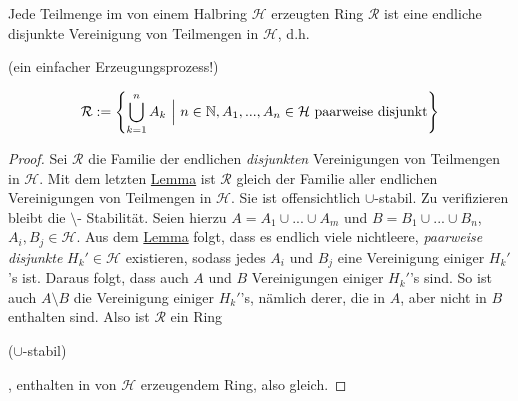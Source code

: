 \begin{proposition}
Jede Teilmenge im von einem Halbring $\mathcal{H}$ erzeugten Ring $\mathcal{R}$ ist eine endliche disjunkte Vereinigung von Teilmengen in $\mathcal{H}$, d.h. \begin{scriptsize}(ein einfacher Erzeugungsprozess!)\end{scriptsize}
\begin{equation}
\mathcal{R} := \left\{ \bigcup_{k=1}^n A_k \  \Big\rvert \ n\in \mathbb{N}, A_1,...,A_n \in \mathcal{H} \text{ paarweise disjunkt} \right\}
\label{eqI14}
\end{equation}
\begin{proof}
Sei $\mathcal{R}$ die Familie der endlichen \emph{disjunkten} Vereinigungen von Teilmengen in $\mathcal{H}$. Mit dem letzten \hyperref[lemmaA]{Lemma} ist $\mathcal{R}$ gleich der Familie aller endlichen Vereinigungen von Teilmengen in $\mathcal{H}$. Sie ist offensichtlich $\cup$-stabil. Zu verifizieren bleibt die $\setminus$- Stabilität. Seien hierzu $A = A_1 \cup ... \cup A_m$ und $B = B_1 \cup ... \cup B_n$, $A_i, B_j \in \mathcal{H}$. Aus dem \hyperref[lemmaA]{Lemma}  folgt, dass es endlich viele nichtleere, \emph{paarweise disjunkte} $H_k' \in \mathcal{H}$ existieren, sodass jedes $A_i$ und $B_j$ eine Vereinigung einiger $H_k'$'s ist. Daraus folgt, dass auch $A$ und $B$ Vereinigungen einiger $H_k'$'s sind. So ist auch $A\setminus B$ die Vereinigung einiger $H_k'$'s, nämlich derer, die in $A$, aber nicht in $B$ enthalten sind. Also ist $\mathcal{R}$ ein Ring \begin{scriptsize}($\cup$-stabil)\end{scriptsize}, enthalten in von $\mathcal{H}$ erzeugendem Ring, also gleich.
\end{proof}
\end{proposition}


